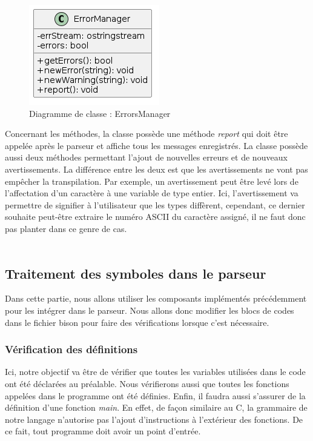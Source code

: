 \documentclass[a4paper]{article}%
\begin{document}
\clearpage
\begin{figure}[h!]
  \begin{center}
  \includegraphics[scale=0.5]{../ressources/diagrams/errMgr.png}
  \caption{Diagramme de classe : ErrorsManager}
  \end{center}
\end{figure}

Concernant les méthodes, la classe possède une méthode \textit{report} qui doit
être appelée après le parseur et affiche tous les messages enregistrés. La
classe possède aussi deux méthodes permettant l'ajout de nouvelles erreurs et
de nouveaux avertissements. La différence entre les deux est que les
avertissements ne vont pas empêcher la transpilation. Par exemple, un
avertissement peut être levé lors de l'affectation d'un caractère à une variable
de type entier. Ici, l'avertissement va permettre de signifier à l'utilisateur
que les types diffèrent, cependant, ce dernier souhaite peut-être extraire le
numéro ASCII du caractère assigné, il ne faut donc pas planter dans ce genre de
cas.\\~\\

\subsection{Traitement des symboles dans le parseur}

Dans cette partie, nous allons utiliser les composants implémentés précédemment
pour les intégrer dans le parseur. Nous allons donc modifier les blocs de
codes dans le fichier bison pour faire des vérifications lorsque c'est
nécessaire.

\subsubsection*{Vérification des définitions}\label{sec:verifDef}

Ici, notre objectif va être de vérifier que toutes les variables utilisées dans
le code ont été déclarées au préalable. Nous vérifierons aussi que toutes les
fonctions appelées dans le programme ont été définies. Enfin, il faudra aussi
s'assurer de la définition d'une fonction \textit{main}. En effet, de façon
similaire au C, la grammaire de notre langage n'autorise pas l'ajout
d'instructions à l'extérieur des fonctions. De ce fait, tout programme doit
avoir un point d'entrée.\\
\end{document}
